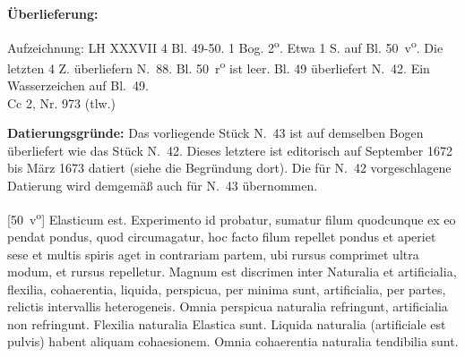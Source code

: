\begin{ledgroupsized}[r]{120mm}
\footnotesize 
\pstart 
\noindent\textbf{\"{U}berlieferung:}
\pend
\end{ledgroupsized}
\begin{ledgroupsized}[r]{114mm}
\footnotesize 
\pstart \parindent -6mm
%
Aufzeichnung:
 LH XXXVII 4 Bl. 49-50.
1 Bog. 2\textsuperscript{o}.
Etwa 1 S. auf Bl. 50~v\textsuperscript{o}.
Die letzten 4 Z. %
überliefern N.~88.
Bl. 50~r\textsuperscript{o} ist leer.
Bl. 49 überliefert N.~42. Ein Wasserzeichen
 auf Bl.~49.\\%
Cc 2, Nr. 973  (tlw.)
\pend
\end{ledgroupsized}
%
\vspace*{5mm}
\begin{ledgroup}
\footnotesize 
\pstart
\noindent\footnotesize{\textbf{Datierungsgr\"{u}nde:}
Das vorliegende Stück N.~43 ist auf demselben Bogen überliefert wie das Stück N.~42. %
Dieses letztere ist editorisch auf September 1672 bis März 1673 datiert (siehe die Begründung dort).
Die für N.~42 vorgeschlagene Datierung wird demgemäß auch für N.~43 übernommen.}
\pend
\end{ledgroup}
%
\count{}
\count{}
\count{}
\vspace*{8mm}%
\pstart%
\noindent%
\normalsize%
[50~v\textsuperscript{o}] 
  Elasticum\protect{} est. Experimento id probatur, sumatur filum quodcunque ex eo pendat pondus, quod circumagatur, hoc facto filum repellet pondus et aperiet sese et multis spiris aget in contrariam partem, ubi rursus comprimet ultra modum, et rursus repelletur.\pend 
\pstart Magnum est discrimen inter Naturalia et artificialia, flexilia, cohaerentia, liquida, perspicua,   per minima sunt, artificialia, per partes, relictis intervallis heterogeneis. Omnia perspicua naturalia refringunt, artificialia non refringunt. Flexilia naturalia Elastica sunt. Liquida naturalia (artificiale est pulvis) habent aliquam cohaesionem. Omnia cohaerentia naturalia tendibilia sunt.
